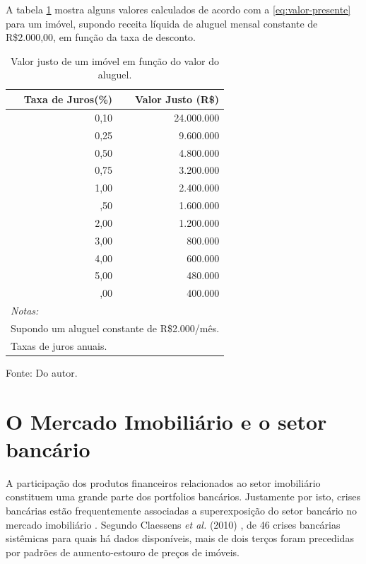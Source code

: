\documentclass[
	12pt,				%
	oneside,			%
	a4paper,			%
	chapter=TITLE,		%
	section=TITLE,		%
	english,			%
	brazil				%
	]{abntex2}
\newcommand{\bcenter}{\begin{center}}
\newcommand{\ecenter}{\end{center}}
\begin{document}
A tabela \ref{tab:tabela-valor-justo} mostra alguns valores calculados de
acordo com a \eqref{eq:valor-presente} para um imóvel, supondo receita líquida de
aluguel mensal constante de R\$2.000,00, em função da taxa de desconto.
\begin{table}[H]

\caption{\label{tab:tabela-valor-justo}Valor justo de um imóvel em função do valor do aluguel.}
\centering
\begin{tabular}[t]{rr}
\toprule
Taxa de Juros(\%) & Valor Justo (R\$)\\
\midrule
0,10 & 24.000.000\\
0,25 & 9.600.000\\
0,50 & 4.800.000\\
0,75 & 3.200.000\\
1,00 & 2.400.000\\
\addlinespace
1,50 & 1.600.000\\
2,00 & 1.200.000\\
3,00 & 800.000\\
4,00 & 600.000\\
5,00 & 480.000\\
\addlinespace
6,00 & 400.000\\
\bottomrule
\multicolumn{2}{l}{\textit{Notas:}}\\
\multicolumn{2}{l}{Supondo um aluguel constante de R\$2.000/mês.}\\
\multicolumn{2}{l}{Taxas de juros anuais.}\\
\end{tabular}
\end{table}
\bcenter

Fonte: Do autor.
\ecenter

\hypertarget{MI-e-o-setor-bancario}{%
\section{O Mercado Imobiliário e o setor bancário}\label{MI-e-o-setor-bancario}}

A participação dos produtos financeiros relacionados ao setor imobiliário
constituem uma grande parte dos portfolios bancários. Justamente por isto,
crises bancárias estão frequentemente associadas a superexposição do setor
bancário no mercado imobiliário \autocite[148]{Case2000}. Segundo Claessens \emph{et al.}
(2010) \autocite[\emph{apud}][3]{silver}, de 46 crises bancárias sistêmicas para quais há dados
disponíveis, mais de dois terços foram precedidas por padrões de aumento-estouro
de preços de imóveis.
\end{document}
